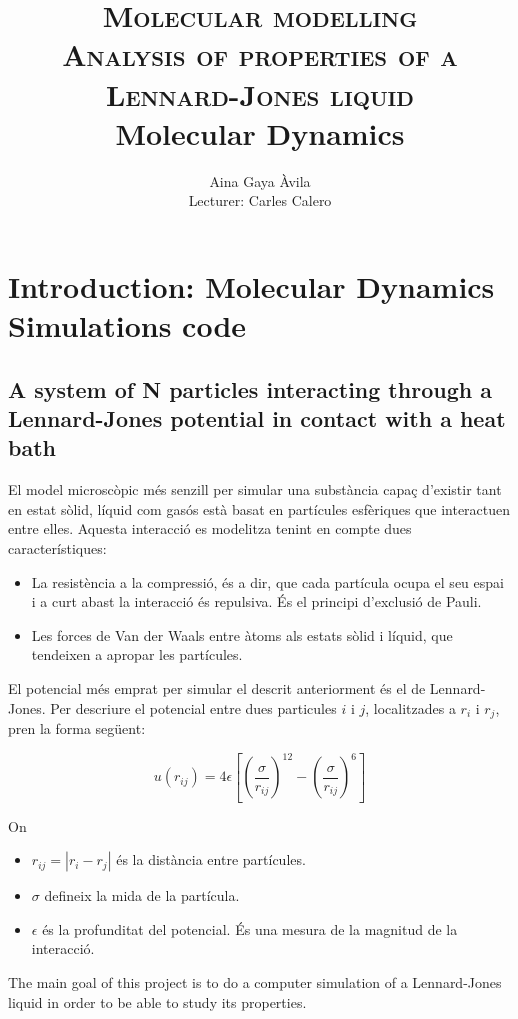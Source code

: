 \documentclass[a4paper,10pt]{article}
\title{\textsc{{\large Molecular modelling } \\ Analysis of properties of a Lennard-Jones liquid } \\  {\small Molecular Dynamics}}
\author{Aina Gaya Àvila \\ {\small Lecturer: Carles Calero }}
\begin{document}
		
\maketitle

\section{Introduction: Molecular Dynamics Simulations code}
\subsection{A system of N particles interacting through a Lennard-Jones potential in contact with a heat bath} 

El model microscòpic més senzill per simular una substància capaç d'existir tant en estat sòlid, líquid com gasós està basat en partícules esfèriques que interactuen entre elles. Aquesta interacció es modelitza tenint en compte dues característiques:
\begin{itemize}
	\item La resistència a la compressió, és a dir, que cada partícula ocupa el seu espai i a curt abast la interacció és repulsiva. És el principi d'exclusió de Pauli.
	\item Les forces de Van der Waals entre àtoms als estats sòlid i líquid, que tendeixen a apropar les partícules.
\end{itemize}

El potencial més emprat per simular el descrit anteriorment és el de Lennard-Jones. Per descriure el potencial entre dues particules $i$ i $j$, localitzades a $r_i$ i $r_j$, pren la forma següent:

$$ u(r_{ij}) = 4 \epsilon \left[ \left( \frac{\sigma}{r_{ij}}\right)^{12} - \left( \frac{\sigma}{r_{ij}}\right)^{6} \right] $$

On 

\begin{itemize}
	\item $r_{ij} = | r_i - r_j | $ és la distància entre partícules.
	\item $\sigma$ defineix la mida de la partícula.
	\item $\epsilon$ és la profunditat del potencial. És una mesura de la magnitud de la interacció.
\end{itemize}

The main goal of this project is to do a computer simulation of a Lennard-Jones liquid in order to be able to study its properties.
\end{document}
